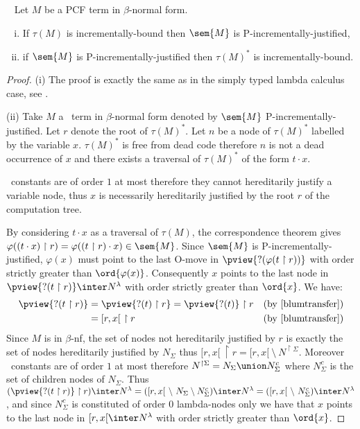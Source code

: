 \begin{proposition} \
\label{prop:incrbound_imp_incrjustified_pcf} Let $M$ be a PCF term in $\beta$-normal form.
\begin{enumerate}[(i)]
\item  If $\tau(M)$ is incrementally-bound then $\sem{M}$ is P-incrementally-justified,
\item  if $\sem{M}$ is P-incrementally-justified
then $\tau(M)^*$ is incrementally-bound.
\end{enumerate}
\end{proposition}
\begin{proof}
(i) The proof is exactly the same as in the simply typed lambda calculus case,
see \cite[Proposition 4.1.5(i)]{blumtransfer}.

\noindent (ii)
Take $M$ a \pcf\ term in $\beta$-normal form denoted by $\sem{M}$ P-incrementally-justified. Let $r$ denote the root of $\tau(M)^*$.
Let $n$ be a node of $\tau(M)^*$ labelled by the variable $x$.
$\tau(M)^*$ is free from dead code therefore $n$ is not a dead occurrence of $x$ and there exists a traversal of $\tau(M)^*$ of the form $t \cdot x$.

\pcf\ constants are of order $1$ at most therefore they cannot hereditarily justify a variable node, thus $x$ is necessarily hereditarily justified by the root $r$ of the computation tree.


By considering $t\cdot x$ as a traversal of $\tau(M)$,  the correspondence theorem gives $\varphi((t \cdot x) \upharpoonright r) = \varphi((t \upharpoonright r) \cdot x) \in \sem{M}$. Since $\sem{M}$ is P-incrementally-justified, $\varphi(x)$ must point to the last O-move in $\pview{?(\varphi(t \upharpoonright
r))}$ with order strictly greater than $\ord{\varphi(x)}$.
Consequently $x$ points to the last node in $\pview{?(t
\upharpoonright r)} \inter N^{\lambda}$ with order strictly greater than $\ord{x}$. We have:
\begin{align*}
\pview{?(t \upharpoonright r)} &= \pview{?(t) \upharpoonright r} = \pview{?(t)} \upharpoonright r & (\mbox{by \cite[lemma 3.1.23]{blumtransfer}}) \\
& = [r,x[ \ \upharpoonright r & (\mbox{by \cite[proposition 3.1.20]{blumtransfer}})
\end{align*}
Since $M$ is in $\beta$-nf, the set of nodes not hereditarily justified by $r$ is exactly the set of nodes hereditarily justified by $N_{\Sigma}$ thus
$[r,x[ \ \upharpoonright r = [r,x[\ \setminus\  N^{\upharpoonright \Sigma}$.
Moreover \pcf\ constants are of order $1$ at most therefore $N^{\upharpoonright \Sigma} = N_{\Sigma} \union N^c_{\Sigma}$
where $N^c_{\Sigma}$ is the set of children nodes of $N_{\Sigma}$.
Thus $(\pview{?(t \upharpoonright r)}\upharpoonright r) \inter N^{\lambda} =
([r,x[\ \setminus\  N_{\Sigma} \setminus N^c_{\Sigma} ) \inter N^{\lambda} =
([r,x[\ \setminus\  N^c_{\Sigma} )  \inter N^{\lambda}$, and
since $N^c_{\Sigma}$ is constituted of order $0$ lambda-nodes only we have that
$x$ points to the last node in $[r,x[ \inter N^{\lambda}$ with order strictly greater than $\ord{x}$.


\end{proof}

